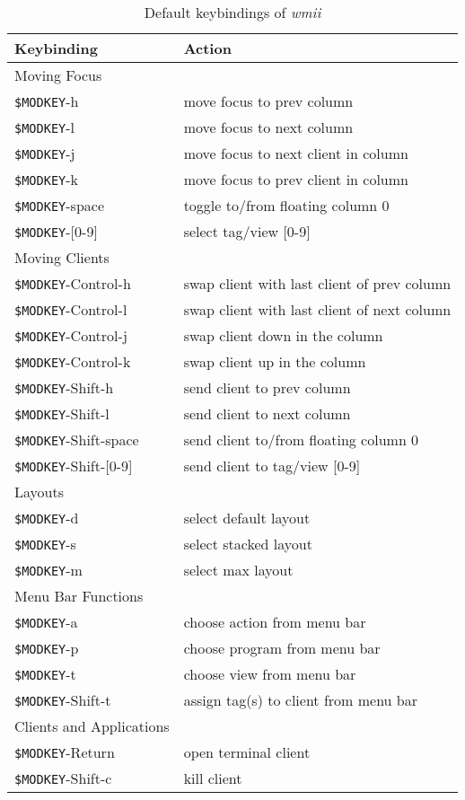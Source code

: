 \documentclass[12pt,a4paper]{article} %
\newcommand{\wmii}{\emph{wmii}}
\begin{document}
    \begin{table}[h]
      \begin{tabular}{|l|l|}
        \hline %
        Keybinding &Action \\ %
        \hline 
        \hline 
        Moving Focus&\\
        \verb+$MODKEY+-h&move focus to prev column \\
        \verb+$MODKEY+-l&move focus to next column \\
        \verb+$MODKEY+-j&move focus to next client in column \\
        \verb+$MODKEY+-k&move focus to prev client in column \\
        \verb+$MODKEY+-space&toggle to/from floating column 0 \\
        \verb+$MODKEY+-[0-9]&select tag/view [0-9] \\
        Moving Clients&\\
        \verb+$MODKEY+-Control-h&swap client with last client of prev column \\
        \verb+$MODKEY+-Control-l&swap client with last client of next column \\
        \verb+$MODKEY+-Control-j&swap client down in the column \\
        \verb+$MODKEY+-Control-k&swap client up in the column \\
        \verb+$MODKEY+-Shift-h&send client to prev column \\
        \verb+$MODKEY+-Shift-l&send client to next column \\
        \verb+$MODKEY+-Shift-space&send client to/from floating column 0 \\
        \verb+$MODKEY+-Shift-[0-9]&send client to tag/view [0-9] \\
        Layouts&\\
        \verb+$MODKEY+-d&select default layout \\
        \verb+$MODKEY+-s&select stacked layout \\
        \verb+$MODKEY+-m&select max layout \\
        Menu Bar Functions&\\
        \verb+$MODKEY+-a&choose action from menu bar \\
        \verb+$MODKEY+-p&choose program from menu bar \\
        \verb+$MODKEY+-t&choose view from menu bar \\
        \verb+$MODKEY+-Shift-t&assign tag(s)  to client from menu bar \\
        Clients and Applications&\\
        \verb+$MODKEY+-Return&open terminal client \\
        \verb+$MODKEY+-Shift-c&kill client \\
        \hline 
      \end{tabular} 
      \caption{Default keybindings of \wmii} 
    \end{table}
\end{document}
